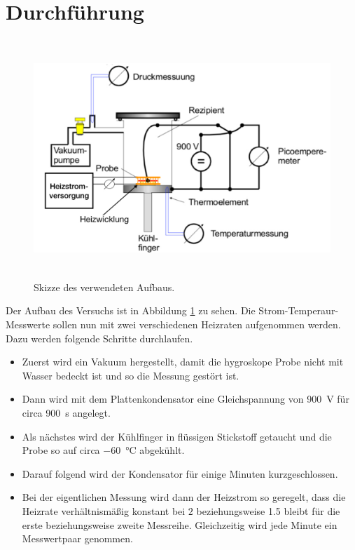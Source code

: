  \section{Durchführung}
\label{sec:Durchführung}

\begin{figure}
  \centering
  \includegraphics[height= 9cm]{BestNippelpiercings/aufbau.pdf}
  \caption{Skizze des verwendeten Aufbaus. \cite{anleitung}}
  \label{fig:aufbau}
\end{figure}
Der Aufbau des Versuchs ist in Abbildung \ref{fig:aufbau} zu sehen. Die Strom-Temperaur-Messwerte sollen nun mit zwei verschiedenen Heizraten aufgenommen werden. Dazu werden folgende Schritte durchlaufen.

\begin{itemize}
  \item Zuerst wird ein Vakuum hergestellt, damit die hygroskope Probe nicht mit Wasser bedeckt ist und so die Messung gestört ist.
  \item Dann wird mit dem Plattenkondensator eine Gleichspannung von \SI{900}{\volt} für circa \SI{900}{\second} angelegt.
  \item Als nächstes wird der Kühlfinger in flüssigen Stickstoff getaucht und die Probe so auf circa \SI{-60}{\celsius} abgekühlt.
  \item Darauf folgend wird der Kondensator für einige Minuten kurzgeschlossen.
  \item Bei der eigentlichen Messung wird dann der Heizstrom so geregelt, dass die Heizrate verhältnismäßig konstant bei $2$ beziehungsweise \num{1.5} bleibt für die erste beziehungsweise zweite Messreihe. Gleichzeitig wird jede Minute ein Messwertpaar genommen.
\end{itemize}
